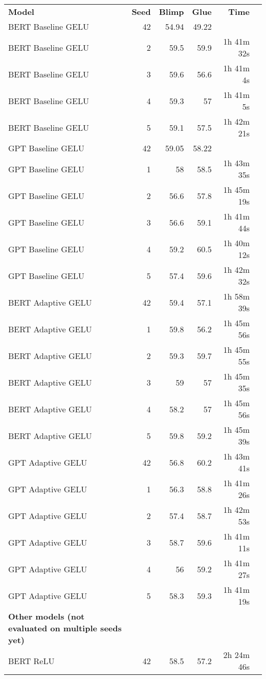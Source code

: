 \begin{table}[!htp]\centering
    \scriptsize
    \begin{tabular}{lrrrrr}\toprule
    \textbf{Model} &\textbf{Seed} &\textbf{Blimp} &\textbf{Glue} &\textbf{Time} \\\cmidrule{1-5}
    BERT Baseline GELU &42 &54.94 &49.22 & \\
    BERT Baseline GELU &2 &59.5 &59.9 &1h 41m 32s \\
    BERT Baseline GELU &3 &59.6 &56.6 &1h 41m 4s \\
    BERT Baseline GELU &4 &59.3 &57 &1h 41m 5s \\
    BERT Baseline GELU &5 &59.1 &57.5 &1h 42m 21s \\
    GPT Baseline GELU &42 &59.05 &58.22 & \\
    GPT Baseline GELU &1 &58 &58.5 &1h 43m 35s \\
    GPT Baseline GELU &2 &56.6 &57.8 &1h 45m 19s \\
    GPT Baseline GELU &3 &56.6 &59.1 &1h 41m 44s \\
    GPT Baseline GELU &4 &59.2 &60.5 &1h 40m 12s \\
    GPT Baseline GELU &5 &57.4 &59.6 &1h 42m 32s \\
    BERT Adaptive GELU &42 &59.4 &57.1 &1h 58m 39s \\
    BERT Adaptive GELU &1 &59.8 &56.2 &1h 45m 56s \\
    BERT Adaptive GELU &2 &59.3 &59.7 &1h 45m 55s \\
    BERT Adaptive GELU &3 &59 &57 &1h 45m 35s \\
    BERT Adaptive GELU &4 &58.2 &57 &1h 45m 56s \\
    BERT Adaptive GELU &5 &59.8 &59.2 &1h 45m 39s \\
    GPT Adaptive GELU &42 &56.8 &60.2 &1h 43m 41s \\
    GPT Adaptive GELU &1 &56.3 &58.8 &1h 41m 26s \\
    GPT Adaptive GELU &2 &57.4 &58.7 &1h 42m 53s \\
    GPT Adaptive GELU &3 &58.7 &59.6 &1h 41m 11s \\
    GPT Adaptive GELU &4 &56 &59.2 &1h 41m 27s \\
    GPT Adaptive GELU &5 &58.3 &59.3 &1h 41m 19s \\
    \toprule \textbf{Other models (not evaluated on multiple seeds yet) } & & & & \\ \midrule
    BERT ReLU &42 &58.5 &57.2 &2h 24m 46s \\

\end{tabular}
\end{table}
